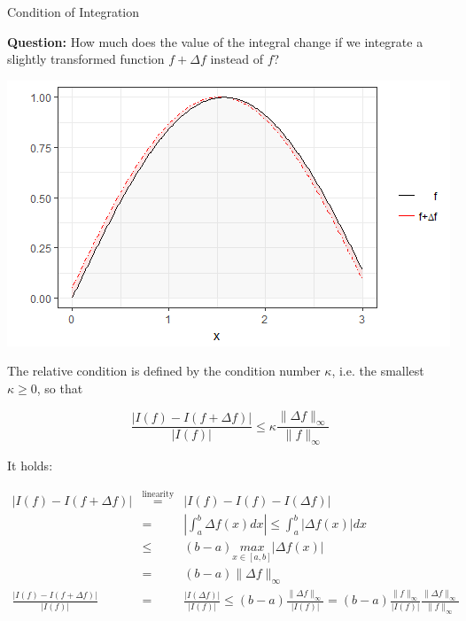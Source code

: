 \begin{vbframe}{Condition of Integration}

\textbf{Question:} How much does the value of the integral change if we integrate a slightly transformed function $f + \Delta f$ instead of $f$?

\vspace*{-0.2cm}
\begin{center}
\includegraphics[width = .8\textwidth]{figure_man/konditionquadratur.png}
\end{center}

\framebreak

The relative condition is defined by the condition number $\kappa$, i.e. the smallest $\kappa \ge 0$, so that

$$
\frac{|I(f) - I(f + \Delta f)|}{|I(f)|} \le \kappa \frac{\|\Delta f\|_\infty}{\|f\|_\infty}
$$

It holds:

\vspace*{-0.5cm}
{\footnotesize
\begin{eqnarray*}
|I(f) - I(f + \Delta f)| &\overset{\text{linearity}}{=}& |I(f) - I(f) - I(\Delta f)| \\
  &=& \left| \int_a^b \Delta f(x)dx \right| \leq \int_a^b |\Delta f(x)|dx \\
  &\leq& (b - a) \underset{x \in [a, b]}{max}|\Delta f(x)| \\
  &=& (b - a) \| \Delta f \|_{\infty} \\[0.3cm]
\frac{|I(f) - I(f + \Delta f)|}{|I(f)|} &=& \frac{|I(\Delta f)|}{|I(f)|} \le (b - a) \frac{\|\Delta f\|_\infty}{|I(f)|} = (b - a) \frac{\|f\|_\infty}{|I(f)|} \frac{\|\Delta f\|_\infty}{\|f\|_\infty}
\end{eqnarray*}
}


\end{vbframe}

